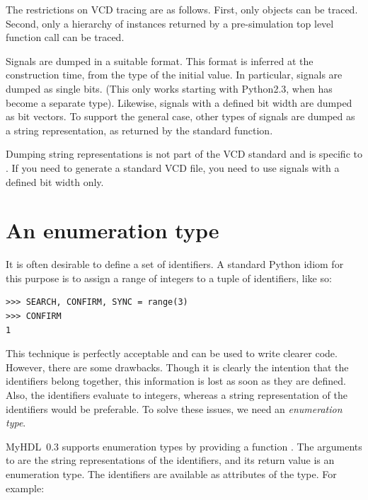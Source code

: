 \documentclass{howto}
\newcommand{\myhdl}{\protect \mbox{MyHDL}}
\begin{document}
The restrictions on VCD tracing are as follows. First, only
 objects can be traced. Second, only a hierarchy of
instances returned by a pre-simulation top level function call can be
traced.

Signals are dumped in a suitable format. This format is inferred at
the  construction time, from the type of the initial
value. In particular,  signals are dumped as single
bits. (This only works starting with Python2.3, when  has
become a separate type).  Likewise,  signals with a
defined bit width are dumped as bit vectors. To support the general
case, other types of signals are dumped as a string representation, as
returned by the standard  function.

\begin{notice}[warning]
Dumping string representations is not part of the VCD standard and is
specific to . If you need to generate a standard VCD
file, you need to use signals with a defined bit width only.
\end{notice}

\section{An enumeration type\label{section-enum}}

It is often desirable to define a set of identifiers.  A standard
Python idiom for this purpose is to assign a range of integers to a
tuple of identifiers, like so:

\begin{verbatim}
>>> SEARCH, CONFIRM, SYNC = range(3)
>>> CONFIRM
1
\end{verbatim}

This technique is perfectly acceptable and can be used to write
clearer code. However, there are some drawbacks. Though it is clearly
the intention that the identifiers belong together, this information
is lost as soon as they are defined. Also, the identifiers evaluate to
integers, whereas a string representation of the identifiers
would be preferable. To solve these issues, we need an
\emph{enumeration type}.

\myhdl\ 0.3 supports enumeration types by providing a function
.  The arguments to  are the string
representations of the identifiers, and its return value is an
enumeration type. The identifiers are available as attributes of the
type. For example:
\end{document}
